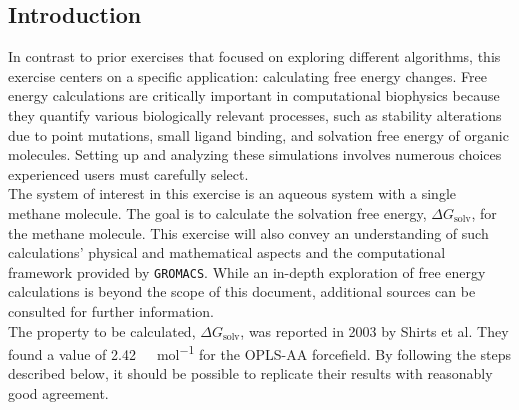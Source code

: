 \documentclass[9pt,tutorial]{livecoms}
\begin{document}
\subsection*{Introduction}
In contrast to prior exercises that focused on exploring different algorithms, this exercise centers on a specific application: calculating free energy changes. Free energy calculations are critically important in computational biophysics because they quantify various biologically relevant processes, such as stability alterations due to point mutations, small ligand binding, and solvation free energy of organic molecules.\cite{Mobley2006} Setting up and analyzing these simulations involves numerous choices experienced users must carefully select.\cite{Christ2009}\\
The system of interest in this exercise is an aqueous system with a single methane molecule. The goal is to calculate the solvation free energy, $\Delta G_\text{solv}$, for the methane molecule. This exercise will also convey an understanding of such calculations' physical and mathematical aspects and the computational framework provided by \texttt{GROMACS}. While an in-depth exploration of free energy calculations is beyond the scope of this document, additional sources can be consulted for further information.\cite{Pohorille2010,Villa2002,Bennett1976}\\
The property to be calculated, $\Delta G_\text{solv}$, was reported in 2003 by Shirts et al. They found a value of \SI{2.42}{\kilo\calorie\per\mole} for the OPLS-AA forcefield.\cite{Shirts_2003} By following the steps described below, it should be possible to replicate their results with reasonably good agreement.\\ 
\end{document}
